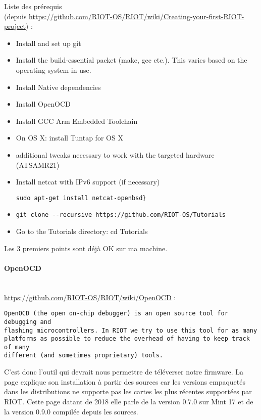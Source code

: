 Liste des prérequis\\
(depuis \url{https://github.com/RIOT-OS/RIOT/wiki/Creating-your-first-RIOT-project}) :
\begin{itemize}
	\item Install and set up git
	\item Install the build-essential packet (make, gcc etc.). This varies based on
			the operating system in use.
	\item Install Native dependencies
	\item Install OpenOCD
	\item Install GCC Arm Embedded Toolchain
	\item On OS X: install Tuntap for OS X
	\item additional tweaks necessary to work with the targeted hardware (ATSAMR21)
	\item Install netcat with IPv6 support (if necessary)
			\begin{verbatim}sudo apt-get install netcat-openbsd}\end{verbatim}
	\item \begin{verbatim}git clone --recursive https://github.com/RIOT-OS/Tutorials\end{verbatim}
	\item Go to the Tutorials directory: cd Tutorials\\
\end{itemize}

Les 3 premiers points sont déjà OK sur ma machine.
\paragraph{OpenOCD}~\\

\url{https://github.com/RIOT-OS/RIOT/wiki/OpenOCD} :
\begin{verbatim}
OpenOCD (the open on-chip debugger) is an open source tool for debugging and
flashing microcontrollers. In RIOT we try to use this tool for as many
platforms as possible to reduce the overhead of having to keep track of many
different (and sometimes proprietary) tools.
\end{verbatim}

C'est donc l'outil qui devrait nous permettre de téléverser notre firmware. La page
explique son installation à partir des sources car les versions empaquetés dans les
distributions ne supporte pas les cartes les plus récentes supportées par RIOT. Cette
page datant de 2018 elle parle de la version 0.7.0 sur Mint 17 et de la version 0.9.0
compilée depuis les sources.\\

